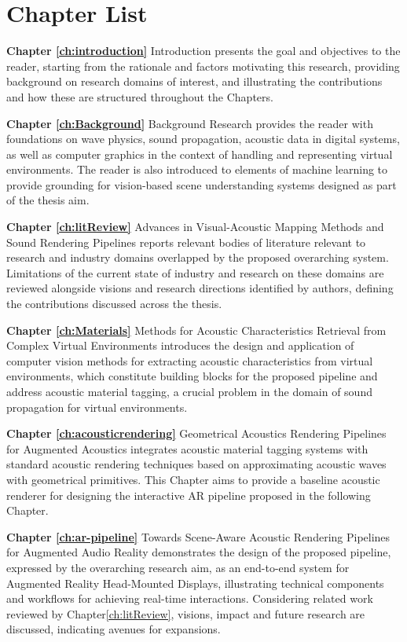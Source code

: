 \section{Chapter List}
\textbf{Chapter \ref{ch:introduction}} Introduction presents the goal and objectives to the reader, starting from the rationale and factors motivating this research, providing background on research domains of interest, and illustrating the contributions and how these are structured throughout the Chapters.

\textbf{Chapter \ref{ch:Background}} Background Research provides the reader with foundations on wave physics, sound propagation, acoustic data in digital systems, as well as computer graphics in the context of handling and representing virtual environments. The reader is also introduced to elements of machine learning to provide grounding for vision-based scene understanding systems designed as part of the thesis aim.

\textbf{Chapter \ref{ch:litReview}} Advances in Visual-Acoustic Mapping Methods and Sound Rendering Pipelines reports relevant bodies of literature relevant to research and industry domains overlapped by the proposed overarching system. Limitations of the current state of industry and research on these domains are reviewed alongside visions and research directions identified by authors, defining the contributions discussed across the thesis.

\textbf{Chapter \ref{ch:Materials}} Methods for Acoustic Characteristics Retrieval from Complex Virtual Environments introduces the design and application of computer vision methods for extracting acoustic characteristics from virtual environments, which constitute building blocks for the proposed pipeline and address acoustic material tagging, a crucial problem in the domain of sound propagation for virtual environments.

\textbf{Chapter \ref{ch:acousticrendering}} Geometrical Acoustics Rendering Pipelines for Augmented Acoustics integrates acoustic material tagging systems with standard acoustic rendering techniques based on approximating acoustic waves with geometrical primitives. This Chapter aims to provide a baseline acoustic renderer for designing the interactive AR pipeline proposed in the following Chapter.

\textbf{Chapter \ref{ch:ar-pipeline}} Towards Scene-Aware Acoustic Rendering Pipelines for Augmented Audio Reality demonstrates the design of the proposed pipeline, expressed by the overarching research aim, as an end-to-end system for Augmented Reality Head-Mounted Displays, illustrating technical components and workflows for achieving real-time interactions. Considering related work reviewed by Chapter\ref{ch:litReview}, visions, impact and future research are discussed, indicating avenues for expansions.

